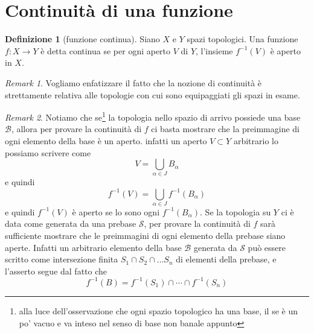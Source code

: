\documentclass[10pt,a4paper]{article}
\theoremstyle{definition}
\newtheorem{defi}{Definizione}
\theoremstyle{plain}
\theoremstyle{remark}
\newtheorem{rem}{Remark}
\theoremstyle{remark}
\newcommand{\B}{\mathcal{B}}
\newcommand{\Ss}{\mathcal{S}}
\begin{document}
\section{Continuità di una funzione}
%
%
\begin{defi}[funzione continua] Siano $X$ e $Y$ spazi topologici. Una funzione
$f : X \to Y$ è detta continua se per ogni aperto $V$ di $Y$, l'insieme
$f^{-1}(V)$ è aperto in $X$.
\end{defi}

\begin{rem} Vogliamo enfatizzare il fatto che la nozione di continuità è
strettamente relativa alle topologie con cui sono equipaggiati gli spazi in
esame.
\end{rem}

\begin{rem} Notiamo che se\footnote{alla luce dell'osservazione che ogni spazio
topologico ha una base, il se è un po' vacuo e va inteso nel senso di base non
banale appunto} la topologia nello spazio di arrivo possiede una base $\B$,
allora per provare la continuità di $f$ ci basta mostrare che la preimmagine di
ogni elemento della base è un aperto. infatti un aperto $V \subset Y$ arbitrario
lo possiamo scrivere come \[ V = \bigcup_{\alpha \in J} B_{\alpha} \] e
quindi \[ f^{-1}(V) = \bigcup_{\alpha \in J} f^{-1}(B_{\alpha}) \] e quindi
$f^{-1}(V)$ è aperto se lo sono ogni $f^{-1}(B_{\alpha})$. Se la topologia su
$Y$ ci è data come generata da una prebase $\Ss$, per provare la continuità di
$f$ sarà sufficiente mostrare che le preimmagini di ogni elemento della prebase
siano aperte. Infatti un arbitrario elemento della base $\B$ generata da $\Ss$
può essere scritto come intersezione finita $S_1 \cap S_2 \cap \dots S_n$ di
elementi della prebase, e l'asserto segue dal fatto che \[ f^{-1}(B) =
f^{-1}(S_1) \cap \cdots \cap f^{-1}(S_n) \]
\end{rem}
\end{document}
